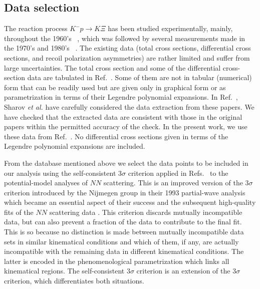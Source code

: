 \documentclass[10pt,aps,prc,superscriptaddress,twoside,twocolumn,nofootinbib,showpacs,preprintnumbers]{revtex4-1}
\begin{document}
\subsection{Data selection} 
\label{subsec:KXi-DataSelect}
The reaction process $K^-p \to K \Xi$ has been studied experimentally, mainly, throughout the 1960's~%
\cite{Pjerrou:1962pc,Carmony:1964zza,Berge:1966zz,Haque:1966mda,London:1966zz,Trippe:1967wat,Trower:1968zz,Merrill:1968zz,Burgun:1969ee,Dauber:1969hg}, which was followed by several measurements made in the 1970's and 1980's~%
\cite{Scheuer:1971zw,DeBellefon:1972gm,Carlson:1973td,Rader:1973ja,Griselin:1975pa,Briefel:1977bp,Dumbrajs:1983jd}. The existing data (total cross sections, differential cross sections, and recoil polarization asymmetries) are rather limited and suffer from large uncertainties. The total cross section and some of the differential cross-section data are tabulated in 
Ref.~\cite{FMMR83b}. Some of them are not in tabular (numerical) form that can be readily used but are given only 
in graphical form or as parametrization in terms of their Legendre polynomial expansions. 
In Ref.~\cite{Sharov:2011xq}, Sharov \textit{et al.} have carefully considered the data extraction from these papers. We have checked that the extracted data are consistent with those in the original papers within the permitted accuracy of the check. In the present work, we use these data from Ref.~\cite{Sharov:2011xq}. No differential cross sections given in terms of the Legendre polynomial expansions are included.

From the database mentioned above we select the data points to be included in our analysis using the self-consistent $3\sigma$ criterion applied in Refs.~\cite{Perez:2013jpa,Perez:2014yla} to the potential-model analyses of $NN$ scattering. This is an improved version of the $3\sigma$ criterion introduced by the Nijmegen group in their 1993 partial-wave analysis \cite{Stoks:1993tb} which became an essential aspect of their success and the subsequent high-quality fits of the $NN$ scattering data \cite{Stoks:1994wp,Wiringa:1994wb,Machleidt:2000ge,Gross:2008ps}. This criterion discards mutually incompatible data, but can also prevent a fraction of the data to contribute to the final fit. This is so because no distinction is made between mutually incompatible data sets in similar kinematical conditions and which of them, if any, are actually incompatible with the remaining data in different kinematical conditions. The latter is encoded in the phenomenological parametrization which links all kinematical regions. The self-consistent $3\sigma$ criterion is an extension of the $3\sigma$ criterion, which differentiates both situations.
\end{document}
